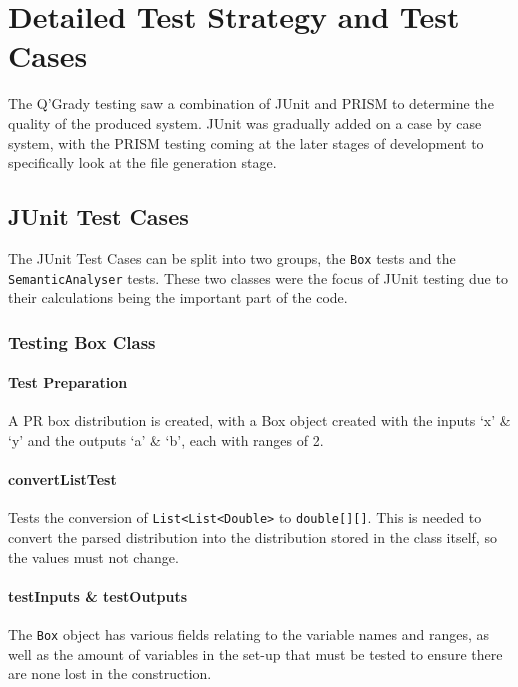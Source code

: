 \documentclass[report.tex]{subfiles}
\begin{document}
\chapter{Detailed Test Strategy and Test Cases} %
\label{cha:detailed_test_strategy_and_test_cases}
The Q'Grady testing saw a combination of JUnit and PRISM to determine the
quality of the produced system. JUnit was gradually added on a case by case
system, with the PRISM testing coming at the later stages of development to
specifically look at the file generation stage.

\section{JUnit Test Cases} %
\label{sec:junit_test_cases}
The JUnit Test Cases can be split into two groups, the \texttt{Box} tests and
the \texttt{SemanticAnalyser} tests. These two classes were the focus of JUnit
testing due to their calculations being the important part of the code.

\subsection{Testing Box Class} %
\label{sub:testing_box_class}
\subsubsection{Test Preparation} %
\label{ssub:test_preparation}
A PR box distribution is created, with a Box object created with the inputs
`x' \& `y' and the outputs `a' \& `b', each with ranges of 2.

\subsubsection{convertListTest} %
\label{ssub:convertListTest}
Tests the conversion of \texttt{List<List<Double>} to \texttt{double[][]}. This
is needed to convert the parsed distribution into the distribution stored in the
class itself,  so the values must not change.

\subsubsection{testInputs \& testOutputs} %
\label{ssub:test_input_output}
The \texttt{Box} object has various fields relating to the variable names and
ranges, as well as the amount of variables in the set-up that must be tested to
ensure there are none lost in the construction.
\end{document}
